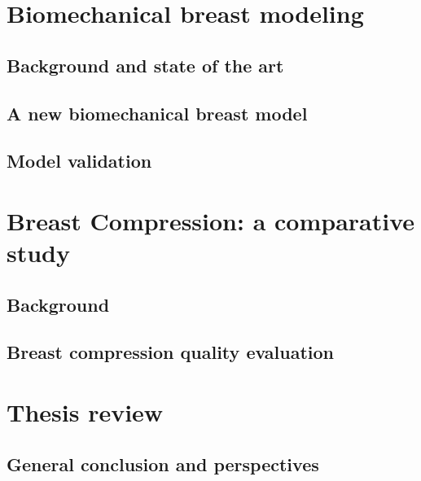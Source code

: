 \documentclass[a4paper,12pt,twoside]{report}
\begin{document}
\clearemptydoublepage
\part{Biomechanical breast modeling}\label{part:bioMecaModels}
\chapter{Background and state of the art}\label{chapter:bioMecaModelsBackground}


\chapter{A new biomechanical breast model}\label{chapter:myBioMecaModel}

\chapter{Model validation}\label{chapter:modelvalidation}


\clearemptydoublepage
\part{Breast Compression: a comparative study}\label{part:breastcompressionDM}
\chapter{ Background }\label{chapter:compression:introduction}


\chapter{Breast compression quality evaluation}\label{chapter:compressionfem}


\clearemptydoublepage
\part{Thesis review}\label{part:thesisreview}
\chapter{General conclusion and perspectives}\label{chapter:generalconclusion}



%
\end{document}
